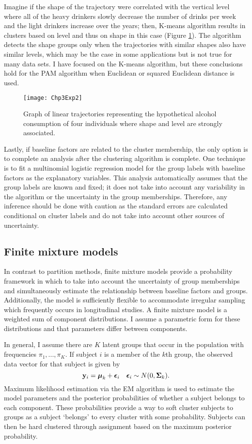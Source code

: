 Imagine if the shape of the trajectory were correlated with the vertical level where all of the heavy drinkers slowly decrease the number of drinks per week and the light drinkers increase over the years; then, K-means algorithm results in clusters based on level and thus on shape in this case (Figure \ref{fig:3-2}). The algorithm detects the shape groups only when the trajectories with similar shapes also have similar levels, which may be the case in some applications but is not true for many data sets. I have focused on the K-means algorithm, but these conclusions hold for the PAM algorithm when Euclidean or squared Euclidean distance is used.
\begin{figure}[ht]
\centering
\texttt{[image: Chp3Exp2]}
\caption{Graph of linear trajectories representing the hypothetical alcohol consumption of four individuals where shape and level are strongly associated.}
\label{fig:3-2} 
\end{figure}

Lastly, if baseline factors are related to the cluster membership, the only option is to complete an analysis after the clustering algorithm is complete. One technique is to fit a multinomial logistic regression model for the group labels with baseline factors as the explanatory variables. This analysis automatically assumes that the group labels are known and fixed; it does not take into account any variability in the algorithm or the uncertainty in the group memberships. Therefore, any inference should be done with caution as the standard errors are calculated conditional on cluster labels and do not take into account other sources of uncertainty.

\subsection{Finite mixture models}
In contrast to partition methods, finite mixture models provide a probability framework in which to take into account the uncertainty of group memberships and simultaneously estimate the relationship between baseline factors and groups. Additionally, the model is sufficiently flexible to accommodate irregular sampling which frequently occurs in longitudinal studies. A finite mixture model is a weighted sum of component distributions. I assume a parametric form for these distributions and that parameters differ between components.

In general, I assume there are $K$ latent groups that occur in the population with frequencies $\pi_{1},...,\pi_{K}$. If subject $i$ is a member of the $k$th group, the observed data vector for that subject is given by
$$\mathbf y_{i} = \boldsymbol\mu_{k}+\boldsymbol\epsilon_{i}\quad \boldsymbol\epsilon_{i} \sim N(0,\boldsymbol\Sigma_{k}).$$
Maximum likelihood estimation via the EM algorithm is used to estimate the model parameters and the posterior probabilities of whether a subject belongs to each component. These probabilities provide a way to soft cluster subjects to groups as a subject `belongs' to every cluster with some probability. Subjects can then be hard clustered through assignment based on the maximum posterior probability. 

